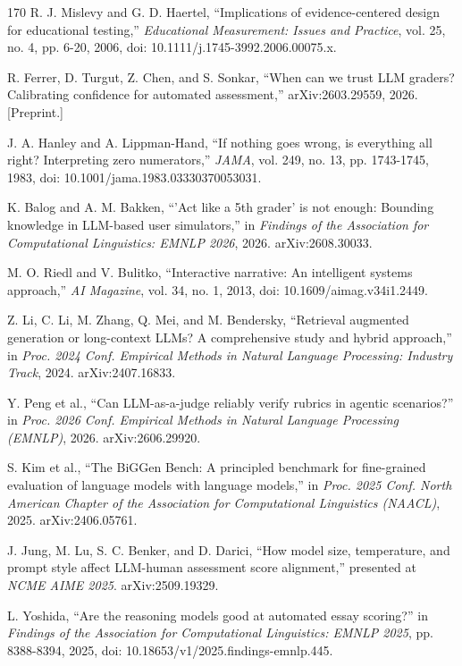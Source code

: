 \begin{thebibliography}{170}
 R. J. Mislevy and G. D. Haertel, ``Implications of evidence-centered design for educational testing,'' \textit{Educational Measurement: Issues and Practice}, vol. 25, no. 4, pp. 6-20, 2006, doi: 10.1111/j.1745-3992.2006.00075.x.

 R. Ferrer, D. Turgut, Z. Chen, and S. Sonkar, ``When can we trust LLM graders? Calibrating confidence for automated assessment,'' arXiv:2603.29559, 2026. [Preprint.]

 J. A. Hanley and A. Lippman-Hand, ``If nothing goes wrong, is everything all right? Interpreting zero numerators,'' \textit{JAMA}, vol. 249, no. 13, pp. 1743-1745, 1983, doi: 10.1001/jama.1983.03330370053031.

 K. Balog and A. M. Bakken, ``'Act like a 5th grader' is not enough: Bounding knowledge in LLM-based user simulators,'' in \textit{Findings of the Association for Computational Linguistics: EMNLP 2026}, 2026. arXiv:2608.30033.

 M. O. Riedl and V. Bulitko, ``Interactive narrative: An intelligent systems approach,'' \textit{AI Magazine}, vol. 34, no. 1, 2013, doi: 10.1609/aimag.v34i1.2449.

 Z. Li, C. Li, M. Zhang, Q. Mei, and M. Bendersky, ``Retrieval augmented generation or long-context LLMs? A comprehensive study and hybrid approach,'' in \textit{Proc. 2024 Conf. Empirical Methods in Natural Language Processing: Industry Track}, 2024. arXiv:2407.16833.

 Y. Peng et al., ``Can LLM-as-a-judge reliably verify rubrics in agentic scenarios?'' in \textit{Proc. 2026 Conf. Empirical Methods in Natural Language Processing (EMNLP)}, 2026. arXiv:2606.29920.

 S. Kim et al., ``The BiGGen Bench: A principled benchmark for fine-grained evaluation of language models with language models,'' in \textit{Proc. 2025 Conf. North American Chapter of the Association for Computational Linguistics (NAACL)}, 2025. arXiv:2406.05761.

 J. Jung, M. Lu, S. C. Benker, and D. Darici, ``How model size, temperature, and prompt style affect LLM-human assessment score alignment,'' presented at \textit{NCME AIME 2025}. arXiv:2509.19329.

 L. Yoshida, ``Are the reasoning models good at automated essay scoring?'' in \textit{Findings of the Association for Computational Linguistics: EMNLP 2025}, pp. 8388-8394, 2025, doi: 10.18653/v1/2025.findings-emnlp.445.


\end{thebibliography}
